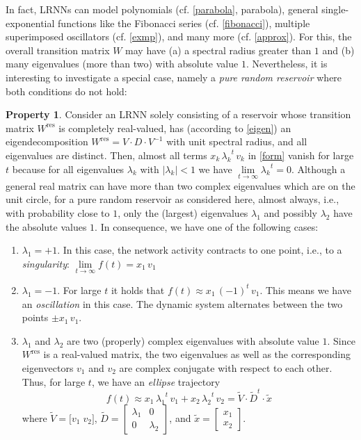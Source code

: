 \documentclass[twoside,11pt]{article}
\theoremstyle{definition}
\newtheorem{prop}{Property}
\begin{document}
In fact, LRNNs can model polynomials (cf. \cref{parabola}, parabola), general
single-exponential functions like the Fibonacci series (cf. \cref{fibonacci}),
multiple superimposed oscillators (cf. \cref{exmp}), and many more (cf.
\cref{approx}). For this, the overall transition matrix $W$ may have (a) a
spectral radius greater than $1$ and (b) many eigenvalues (more than two) with
absolute value $1$. Nevertheless, it is interesting to investigate a special
case, namely a \emph{pure random reservoir} where both conditions do not hold:

\begin{prop}\label{infty}
Consider an LRNN solely consisting of a reservoir whose transition matrix
$W^\mathrm{res}$ is completely real-valued, has (according to \cref{eigen}) an
eigendecomposition $W^\mathrm{res} = V \cdot D \cdot V^{-1}$ with unit spectral
radius, and all eigenvalues are distinct. Then, almost all terms
$x_k\,{\lambda_k}^t\,v_k$ in \cref{form} vanish for large $t$ because for all
eigenvalues $\lambda_k$ with $|\lambda_k| < 1$ we have $\lim\limits_{t \to
\infty} {\lambda_k}^t = 0$. Although a general real matrix can have more than
two complex eigenvalues which are on the unit circle, for a pure random reservoir
as considered here, almost always, i.e., with probability close to $1$, only the
(largest) eigenvalues $\lambda_1$ and possibly $\lambda_2$ have the absolute
values $1$. In consequence, we have one of the following cases:
\begin{enumerate}
  \item $\lambda_1 = +1$. In this case, the network activity contracts to one
	point, i.e., to a \emph{singularity}: $\lim\limits_{t \to \infty}
	f(t) = x_1\,v_1$
  \item $\lambda_1 = -1$. For large $t$ it holds that $f(t) \approx
	x_1\,(-1)^t\,v_1$. This means we have an \emph{oscillation} in this
	case. The dynamic system alternates between the two points $\pm x_1\,v_1$.
  \item $\lambda_1$ and $\lambda_2$ are two (properly) complex eigenvalues with
	absolute value $1$. Since $W^\mathrm{res}$ is a real-valued matrix, the two
	eigenvalues as well as the corresponding eigenvectors $v_1$ and $v_2$
	are complex conjugate with respect to each other. Thus, for large $t$, we
	have an \emph{ellipse} trajectory
	\[
		f(t) \approx x_1\,{\lambda_1}^t\,v_1 + x_2\,{\lambda_2}^t\,v_2
		= \tilde{V} \cdot \tilde{D}^t \cdot \tilde{x}
	\]
	where $\tilde{V} = \big[ v_1\;v_2 \big]$, $\tilde{D} = \left[
	\begin{array}{cc} \lambda_1 & 0 \\ 0 & \lambda_2 \end{array} \right]$,
	and $\tilde{x} = \left[ \begin{array}{c} x_1 \\ x_2 \end{array}
	\right]$.
\end{enumerate}
\end{prop}
\end{document}
